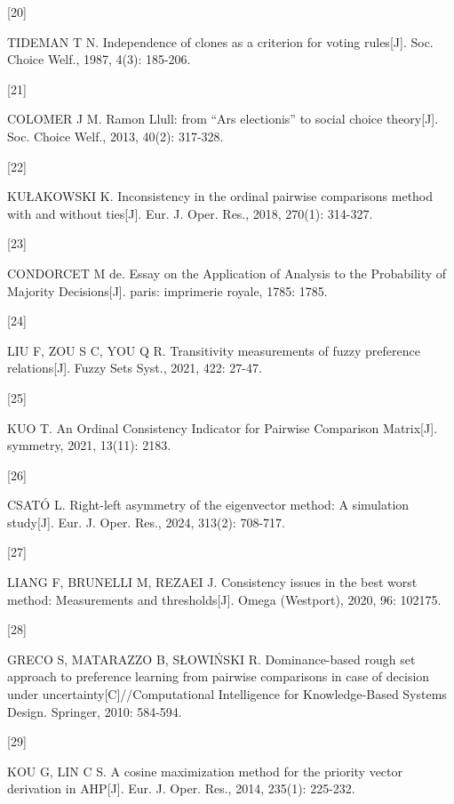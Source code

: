 \documentclass[
  letterpaper,
  DIV=11,
  numbers=noendperiod]{scrartcl}
\newlength{\cslhangindent}
\newlength{\csllabelwidth}
\newenvironment{CSLReferences}[2] %
 {\begin{list}{}{%
  \setlength{\itemindent}{0pt}
  \setlength{\leftmargin}{0pt}
  \setlength{\parsep}{0pt}
  \ifodd #1
   \setlength{\leftmargin}{\cslhangindent}
   \setlength{\itemindent}{-1\cslhangindent}
  \fi
  \setlength{\itemsep}{#2\baselineskip}}}
 {\end{list}}
\newcommand{\CSLLeftMargin}[1]{\parbox[t]{\csllabelwidth}{\strut#1\strut}}
\newcommand{\CSLRightInline}[1]{\parbox[t]{\linewidth - \csllabelwidth}{\strut#1\strut}}
\begin{document}
\begin{CSLReferences}{0}{0}
\CSLLeftMargin{{[}20{]} }%
\CSLRightInline{TIDEMAN T N. Independence of clones as a criterion for
voting rules{[}J{]}. Soc. Choice Welf., 1987, 4(3): 185-206.}

\CSLLeftMargin{{[}21{]} }%
\CSLRightInline{COLOMER J M. Ramon Llull: from {``Ars electionis''} to
social choice theory{[}J{]}. Soc. Choice Welf., 2013, 40(2): 317-328.}

\CSLLeftMargin{{[}22{]} }%
\CSLRightInline{KUŁAKOWSKI K. Inconsistency in the ordinal pairwise
comparisons method with and without ties{[}J{]}. Eur. J. Oper. Res.,
2018, 270(1): 314-327.}

\CSLLeftMargin{{[}23{]} }%
\CSLRightInline{CONDORCET M de. Essay on the Application of Analysis to
the Probability of Majority Decisions{[}J{]}. paris: imprimerie royale,
1785: 1785.}

\CSLLeftMargin{{[}24{]} }%
\CSLRightInline{LIU F, ZOU S C, YOU Q R. Transitivity measurements of
fuzzy preference relations{[}J{]}. Fuzzy Sets Syst., 2021, 422: 27-47.}

\CSLLeftMargin{{[}25{]} }%
\CSLRightInline{KUO T. An Ordinal Consistency Indicator for Pairwise
Comparison Matrix{[}J{]}. symmetry, 2021, 13(11): 2183.}

\CSLLeftMargin{{[}26{]} }%
\CSLRightInline{CSATÓ L. Right-left asymmetry of the eigenvector method:
A simulation study{[}J{]}. Eur. J. Oper. Res., 2024, 313(2): 708-717.}

\CSLLeftMargin{{[}27{]} }%
\CSLRightInline{LIANG F, BRUNELLI M, REZAEI J. Consistency issues in the
best worst method: Measurements and thresholds{[}J{]}. Omega (Westport),
2020, 96: 102175.}

\CSLLeftMargin{{[}28{]} }%
\CSLRightInline{GRECO S, MATARAZZO B, SŁOWIŃSKI R. Dominance-based rough
set approach to preference learning from pairwise comparisons in case of
decision under uncertainty{[}C{]}//Computational Intelligence for
Knowledge-Based Systems Design. Springer, 2010: 584-594.}

\CSLLeftMargin{{[}29{]} }%
\CSLRightInline{KOU G, LIN C S. A cosine maximization method for the
priority vector derivation in {AHP}{[}J{]}. Eur. J. Oper. Res., 2014,
235(1): 225-232.}


\end{CSLReferences}
\end{document}
